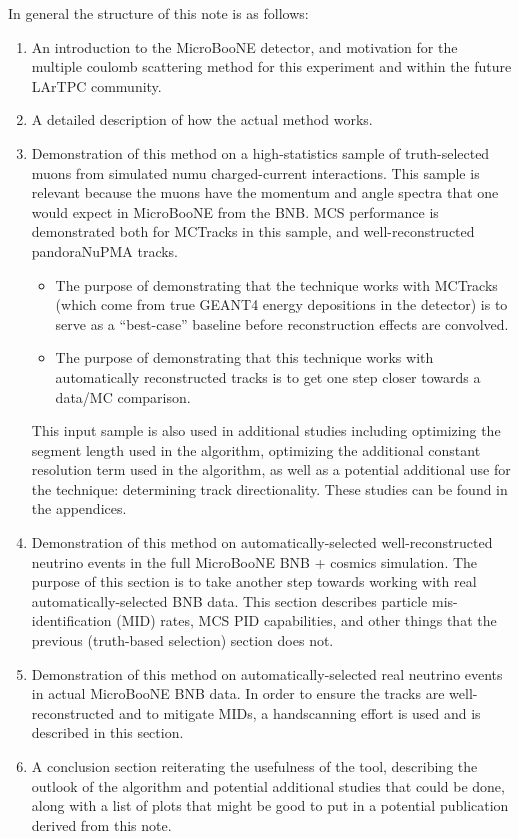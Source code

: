 \documentclass{article}
\begin{document}
In general the structure of this note is as follows:
\begin{enumerate}
\item An introduction to the MicroBooNE detector, and motivation for the multiple coulomb scattering method for this experiment and within the future LArTPC community.
\item A detailed description of how the actual method works.
\item Demonstration of this method on a high-statistics sample of truth-selected muons from simulated numu charged-current interactions. This sample is relevant because the muons have the momentum and angle spectra that one would expect in MicroBooNE from the BNB. MCS performance is demonstrated both for {\sc MCTracks} in this sample, and well-reconstructed pandoraNuPMA tracks. 
\begin{itemize}
	\item The purpose of demonstrating that the technique works with {\sc MCTracks} (which come from true {\sc GEANT4} energy depositions in the detector) is to serve as a ``best-case'' baseline before reconstruction effects are convolved. 
	\item The purpose of demonstrating that this technique works with automatically reconstructed tracks is to get one step closer towards a data/MC comparison.
\end{itemize}
This input sample is also used in additional studies including optimizing the segment length used in the algorithm, optimizing the additional constant resolution term used in the algorithm, as well as a potential additional use for the technique: determining track directionality. These studies can be found in the appendices.
\item Demonstration of this method on automatically-selected well-reconstructed neutrino events in the full MicroBooNE BNB + cosmics simulation. The purpose of this section is to take another step towards working with real automatically-selected BNB data. This section describes particle mis-identification (MID) rates, MCS PID capabilities, and other things that the previous (truth-based selection) section does not.
\item Demonstration of this method on automatically-selected real neutrino events in actual MicroBooNE BNB data. In order to ensure the tracks are well-reconstructed and to mitigate MIDs, a handscanning effort is used and is described in this section.
\item A conclusion section reiterating the usefulness of the tool, describing the outlook of the algorithm and potential additional studies that could be done, along with a list of plots that might be good to put in a potential publication derived from this note.
\end{enumerate}
\end{document}
